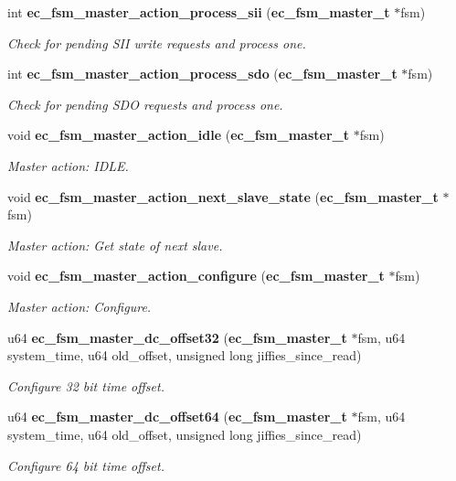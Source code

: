 \begin{DoxyCompactItemize}
int {\bf ec\-\_\-fsm\-\_\-master\-\_\-action\-\_\-process\-\_\-sii} ({\bf ec\-\_\-fsm\-\_\-master\-\_\-t} $\ast$fsm)
\begin{DoxyCompactList}\small\item\em Check for pending S\-I\-I write requests and process one. \end{DoxyCompactList}\item 
int {\bf ec\-\_\-fsm\-\_\-master\-\_\-action\-\_\-process\-\_\-sdo} ({\bf ec\-\_\-fsm\-\_\-master\-\_\-t} $\ast$fsm)
\begin{DoxyCompactList}\small\item\em Check for pending S\-D\-O requests and process one. \end{DoxyCompactList}\item 
void {\bf ec\-\_\-fsm\-\_\-master\-\_\-action\-\_\-idle} ({\bf ec\-\_\-fsm\-\_\-master\-\_\-t} $\ast$fsm)
\begin{DoxyCompactList}\small\item\em Master action\-: I\-D\-L\-E. \end{DoxyCompactList}\item 
void {\bf ec\-\_\-fsm\-\_\-master\-\_\-action\-\_\-next\-\_\-slave\-\_\-state} ({\bf ec\-\_\-fsm\-\_\-master\-\_\-t} $\ast$fsm)
\begin{DoxyCompactList}\small\item\em Master action\-: Get state of next slave. \end{DoxyCompactList}\item 
void {\bf ec\-\_\-fsm\-\_\-master\-\_\-action\-\_\-configure} ({\bf ec\-\_\-fsm\-\_\-master\-\_\-t} $\ast$fsm)
\begin{DoxyCompactList}\small\item\em Master action\-: Configure. \end{DoxyCompactList}\item 
u64 {\bf ec\-\_\-fsm\-\_\-master\-\_\-dc\-\_\-offset32} ({\bf ec\-\_\-fsm\-\_\-master\-\_\-t} $\ast$fsm, u64 system\-\_\-time, u64 old\-\_\-offset, unsigned long jiffies\-\_\-since\-\_\-read)
\begin{DoxyCompactList}\small\item\em Configure 32 bit time offset. \end{DoxyCompactList}\item 
u64 {\bf ec\-\_\-fsm\-\_\-master\-\_\-dc\-\_\-offset64} ({\bf ec\-\_\-fsm\-\_\-master\-\_\-t} $\ast$fsm, u64 system\-\_\-time, u64 old\-\_\-offset, unsigned long jiffies\-\_\-since\-\_\-read)
\begin{DoxyCompactList}\small\item\em Configure 64 bit time offset. \end{DoxyCompactList}\end{DoxyCompactItemize}


